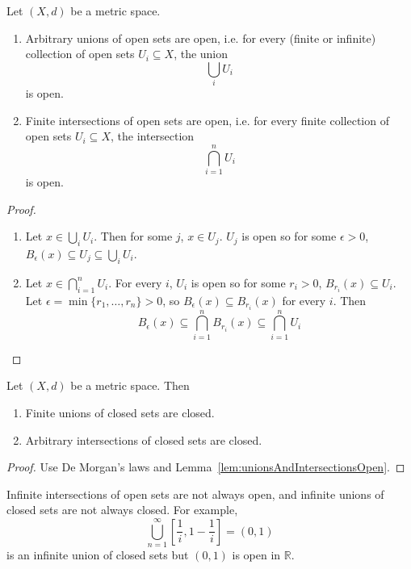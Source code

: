 \begin{lemma}\label{lem:unionsAndIntersectionsOpen}
	Let $(X, d)$ be a metric space.
	\begin{enumerate}
		\item Arbitrary unions of open sets are open, i.e. for every (finite or infinite) collection of open sets $U_i \subseteq X$, the union
		\[
			\bigcup_{i} U_i
		\]
		is open.
		\item Finite intersections of open sets are open, i.e. for every finite collection of open sets $U_i \subseteq X$, the intersection
		\[
			\bigcap_{i = 1}^n U_i
		\]
		is open.
	\end{enumerate}
\end{lemma}

\begin{proof}
	\hfill
	\begin{enumerate}
		\item Let $x \in \bigcup_{i} U_i$. Then for some $j$, $x \in U_j$. $U_j$ is open so for some $\epsilon > 0$, $B_{\epsilon} (x) \subseteq U_j \subseteq \bigcup_{i} U_i$.
		\item Let $x \in \bigcap_{i = 1}^n U_i$. For every $i$, $U_i$ is open so for some $r_i > 0$, $B_{r_i} (x) \subseteq U_i$. Let $\epsilon = \min \{ r_1, \ldots, r_n \} > 0$, so $B_{\epsilon}(x) \subseteq B_{r_i}(x)$ for every $i$. Then
		\[
			B_{\epsilon}(x) \subseteq \bigcap_{i = 1}^n B_{r_i}(x) \subseteq \bigcap_{i = 1}^n U_i
		\]
	\end{enumerate}
\end{proof}

\begin{corollary}
	Let $(X, d)$ be a metric space. Then
	\begin{enumerate}
		\item Finite unions of closed sets are closed.
		\item Arbitrary intersections of closed sets are closed.
	\end{enumerate}
\end{corollary}

\begin{proof}
	Use De Morgan's laws and Lemma~\ref{lem:unionsAndIntersectionsOpen}.
\end{proof}

\begin{remark}
	Infinite intersections of open sets are not always open, and infinite unions of closed sets are not always closed. For example,
	\[
		\bigcup_{n = 1}^{\infty} \left[ \frac{1}{i}, 1 - \frac{1}{i} \right] = (0, 1)
	\]
	is an infinite union of closed sets but $(0, 1)$ is open in $\mathbb{R}$.
\end{remark}

